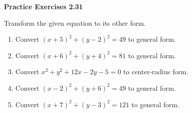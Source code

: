 \vspace{0.3ex}
\noindent\textbf{Practice Exercises 2.31}

\vspace{0.2ex}

Transform the given equation to its other form.

\begin{enumerate}
    \item Convert $(x + 5)^2 + (y - 2)^2 = 49$ to general form.
    \item Convert $(x + 6)^2 + (y + 4)^2 = 81$ to general form.
    \item Convert $x^2 + y^2 + 12x - 2y - 5 = 0$ to center-radius form.
    \item Convert $(x - 2)^2 + (y + 6)^2 = 49$ to general form.
    \item Convert $(x + 7)^2 + (y - 3)^2 = 121$ to general form.
\end{enumerate}
